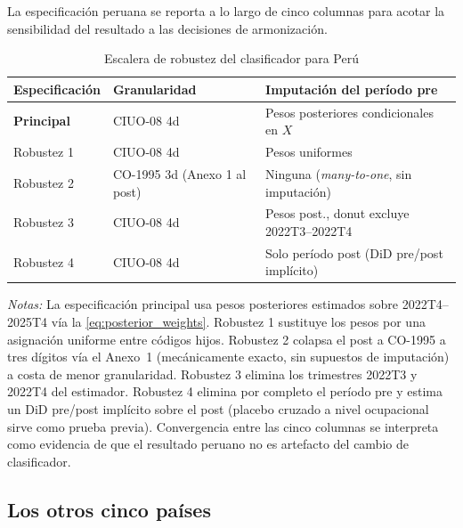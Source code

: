 La especificaci\'{o}n peruana se reporta a lo largo de cinco columnas para acotar la sensibilidad del resultado a las decisiones de armonizaci\'{o}n.

\begin{table}[H]
\centering
\small
\begin{threeparttable}
\caption{Escalera de robustez del clasificador para Per\'{u}}
\label{tab:peru_classifier_ladder}
\begin{tabular}{lll}
\toprule
Especificaci\'{o}n & Granularidad & Imputaci\'{o}n del per\'{i}odo pre \\
\midrule
\textbf{Principal} & CIUO-08 4d & Pesos posteriores condicionales en $X$ \\
Robustez 1 & CIUO-08 4d & Pesos uniformes \\
Robustez 2 & CO-1995 3d (Anexo 1 al post) & Ninguna (\emph{many-to-one}, sin imputaci\'{o}n) \\
Robustez 3 & CIUO-08 4d & Pesos post., donut excluye 2022T3--2022T4 \\
Robustez 4 & CIUO-08 4d & Solo per\'{i}odo post (DiD pre/post impl\'{i}cito) \\
\bottomrule
\end{tabular}
\begin{tablenotes}[flushleft]
\footnotesize
\item \emph{Notas:} La especificaci\'{o}n principal usa pesos posteriores estimados sobre 2022T4--2025T4 v\'{i}a la \cref{eq:posterior_weights}. Robustez 1 sustituye los pesos por una asignaci\'{o}n uniforme entre c\'{o}digos hijos. Robustez 2 colapsa el post a CO-1995 a tres d\'{i}gitos v\'{i}a el Anexo~1 (mec\'{a}nicamente exacto, sin supuestos de imputaci\'{o}n) a costa de menor granularidad. Robustez 3 elimina los trimestres 2022T3 y 2022T4 del estimador. Robustez 4 elimina por completo el per\'{i}odo pre y estima un DiD pre/post impl\'{i}cito sobre el post (placebo cruzado a nivel ocupacional sirve como prueba previa). Convergencia entre las cinco columnas se interpreta como evidencia de que el resultado peruano no es artefacto del cambio de clasificador.
\end{tablenotes}
\end{threeparttable}
\end{table}

\subsection{Los otros cinco pa\'{i}ses}
\label{subsec:data_others}

